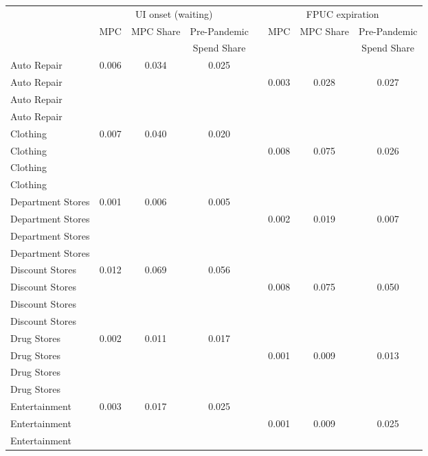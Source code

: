\begin{table}[ht]
\centering
\begin{tabular}{lccccccc}
   \toprule \toprule & \multicolumn{3}{c}{ UI onset (waiting)} &&\multicolumn{3}{c}{ FPUC expiration}\\ \cmidrule(lr){2-4} \cmidrule(lr){6-8} &MPC & MPC Share & Pre-Pandemic&&MPC & MPC Share & Pre-Pandemic\\  & &   & Spend Share&& &   & Spend Share\\ \midrule    Auto Repair & 0.006 & 0.034 & 0.025 &  &  &  &  \\ 
  Auto Repair &  &  &  &  & 0.003 & 0.028 & 0.027 \\ 
  Auto Repair &  &  &  &  &  &  &  \\ 
  Auto Repair &  &  &  &  &  &  &  \\ 
  Clothing & 0.007 & 0.040 & 0.020 &  &  &  &  \\ 
  Clothing &  &  &  &  & 0.008 & 0.075 & 0.026 \\ 
  Clothing &  &  &  &  &  &  &  \\ 
  Clothing &  &  &  &  &  &  &  \\ 
  Department Stores & 0.001 & 0.006 & 0.005 &  &  &  &  \\ 
  Department Stores &  &  &  &  & 0.002 & 0.019 & 0.007 \\ 
  Department Stores &  &  &  &  &  &  &  \\ 
  Department Stores &  &  &  &  &  &  &  \\ 
  Discount Stores & 0.012 & 0.069 & 0.056 &  &  &  &  \\ 
  Discount Stores &  &  &  &  & 0.008 & 0.075 & 0.050 \\ 
  Discount Stores &  &  &  &  &  &  &  \\ 
  Discount Stores &  &  &  &  &  &  &  \\ 
  Drug Stores & 0.002 & 0.011 & 0.017 &  &  &  &  \\ 
  Drug Stores &  &  &  &  & 0.001 & 0.009 & 0.013 \\ 
  Drug Stores &  &  &  &  &  &  &  \\ 
  Drug Stores &  &  &  &  &  &  &  \\ 
  Entertainment & 0.003 & 0.017 & 0.025 &  &  &  &  \\ 
  Entertainment &  &  &  &  & 0.001 & 0.009 & 0.025 \\ 
  Entertainment &  &  &  &  &  &  &  \\ 

\end{tabular}
\end{table}

